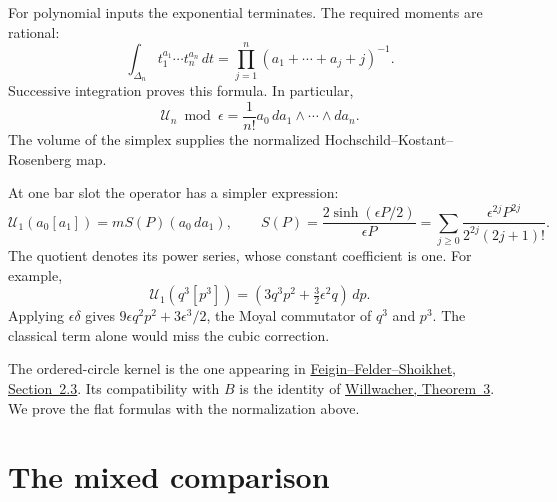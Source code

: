 For polynomial inputs the exponential terminates.
The required moments are rational:
\[
 \int_{\Delta_n}t_1^{a_1}\cdots t_n^{a_n}\,dt
   =\prod_{j=1}^n(a_1+\cdots+a_j+j)^{-1}.
\]
Successive integration proves this formula. In particular,
\[
 \mathcal U_n\bmod\epsilon
     =\frac1{n!}a_0\,da_1\wedge\cdots\wedge da_n.
\]
The volume of the simplex supplies the normalized
Hochschild--Kostant--Rosenberg map.

At one bar slot the operator has a simpler expression:
\begin{equation}\label{mht:eq:circle-onebar}
 \mathcal U_1(a_0[a_1])
 =mS(P)(a_0\,da_1),\qquad
 S(P)=\frac{2\sinh(\epsilon P/2)}{\epsilon P}
 =\sum_{j\geq0}\frac{\epsilon^{2j}P^{2j}}
                         {2^{2j}(2j+1)!}.
\end{equation}
The quotient denotes its power series, whose constant
coefficient is one. For example,
\[
 \mathcal U_1(q^3[p^3])
   =(3q^3p^2+\tfrac32\epsilon^2q)\,dp.
\]
Applying $\epsilon\delta$ gives
$9\epsilon q^2p^2+3\epsilon^3/2$, the Moyal commutator of
$q^3$ and $p^3$. The classical term alone would miss the
cubic correction.

The ordered-circle kernel is the one appearing in
\href{https://arxiv.org/abs/math/0311303v2}
{Feigin--Felder--Shoikhet, Section~2.3}.
Its compatibility with $B$ is the identity of
\href{https://arxiv.org/abs/0804.3887v1}
{Willwacher, Theorem~3}.
We prove the flat formulas with the normalization above.

\section{The mixed comparison}

